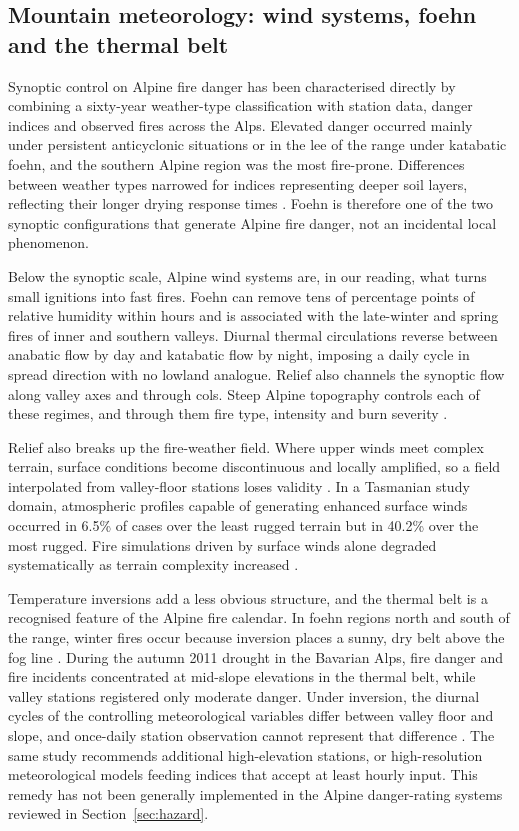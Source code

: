 \documentclass[11pt,a4paper]{article}
\begin{document}
\subsection{Mountain meteorology: wind systems, foehn and the thermal belt}

Synoptic control on Alpine fire danger has been characterised directly by combining a sixty-year weather-type classification with station data, danger indices and observed fires across the Alps. Elevated danger occurred mainly under persistent anticyclonic situations or in the lee of the range under katabatic foehn, and the southern Alpine region was the most fire-prone. Differences between weather types narrowed for indices representing deeper soil layers, reflecting their longer drying response times \citep{wastl_largescale_2013}. Foehn is therefore one of the two synoptic configurations that generate Alpine fire danger, not an incidental local phenomenon.

Below the synoptic scale, Alpine wind systems are, in our reading, what turns small ignitions into fast fires. Foehn can remove tens of percentage points of relative humidity within hours and is associated with the late-winter and spring fires of inner and southern valleys. Diurnal thermal circulations reverse between anabatic flow by day and katabatic flow by night, imposing a daily cycle in spread direction with no lowland analogue. Relief also channels the synoptic flow along valley axes and through cols. Steep Alpine topography controls each of these regimes, and through them fire type, intensity and burn severity \citep{melzner_wildfire-induced_2025}.

Relief also breaks up the fire-weather field. Where upper winds meet complex terrain, surface conditions become discontinuous and locally amplified, so a field interpolated from valley-floor stations loses validity \citep{sharples_overview_2009}. In a Tasmanian study domain, atmospheric profiles capable of generating enhanced surface winds occurred in 6.5\% of cases over the least rugged terrain but in 40.2\% over the most rugged. Fire simulations driven by surface winds alone degraded systematically as terrain complexity increased \citep{ozaki_impact_2022}.

Temperature inversions add a less obvious structure, and the thermal belt is a recognised feature of the Alpine fire calendar. In foehn regions north and south of the range, winter fires occur because inversion places a sunny, dry belt above the fog line \citep{muller_forest_2020}. During the autumn 2011 drought in the Bavarian Alps, fire danger and fire incidents concentrated at mid-slope elevations in the thermal belt, while valley stations registered only moderate danger. Under inversion, the diurnal cycles of the controlling meteorological variables differ between valley floor and slope, and once-daily station observation cannot represent that difference \citep{schunk_forest_2013}. The same study recommends additional high-elevation stations, or high-resolution meteorological models feeding indices that accept at least hourly input. This remedy has not been generally implemented in the Alpine danger-rating systems reviewed in Section~\ref{sec:hazard}.
\end{document}
